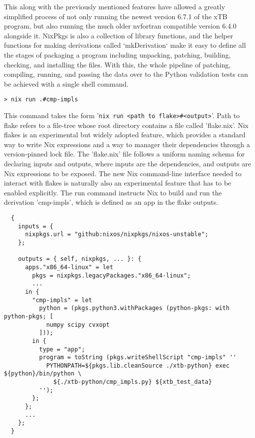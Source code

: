 This along with the previously mentioned features have allowed a greatly simplified process of not only running the newest version 6.7.1 of the xTB program, but also running the much older nvfortran compatible version 6.4.0 alongside it.
NixPkgs is also a collection of library functions, and the helper functions for making derivations called `mkDerivation` make it easy to define all the stages of packaging a program including unpacking, patching, building, checking, and installing the files.
With this, the whole pipeline of patching, compiling, running, and passing the data over to the Python validation tests can be achieved with a single shell command.

\begin{verbatim}
> nix run .#cmp-impls
\end{verbatim}


This command takes the form '\verb|nix run <path to flake>#<output>|'. Path to flake refers to a file-tree whose root directory contains a file called 'flake.nix'. Nix flakes is an experimental but widely adopted feature, which provides a standard way to write Nix expressions and a way to manager their dependencies through a version-pinned lock file. The 'flake.nix' file follows a uniform naming schema for declaring inputs and outputs, where inputs are the dependencies, and outputs are Nix expressions to be exposed.
The new Nix command-line interface needed to interact with flakes is naturally also an experimental feature that has to be enabled explicitly. The run command instructs Nix to build and run the derivation 'cmp-impls', which is defined as an app in the flake outputs.

\newpage

\begin{verbatim}
  {
    inputs = {
      nixpkgs.url = "github:nixos/nixpkgs/nixos-unstable";
    };

    outputs = { self, nixpkgs, ... }: {
      apps."x86_64-linux" = let
        pkgs = nixpkgs.legacyPackages."x86_64-linux";
        ...
      in {
        "cmp-impls" = let
          python = (pkgs.python3.withPackages (python-pkgs: with python-pkgs; [
            numpy scipy cvxopt
          ]));
        in {
          type = "app";
          program = toString (pkgs.writeShellScript "cmp-impls" ''
            PYTHONPATH=${pkgs.lib.cleanSource ./xtb-python} exec ${python}/bin/python \
              ${./xtb-python/cmp_impls.py} ${xtb_test_data}
          '');
        };
      };
      ...
    };
  }
\end{verbatim}

